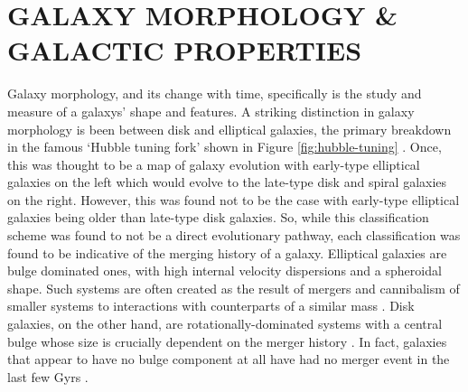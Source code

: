 \section{GALAXY MORPHOLOGY \& GALACTIC PROPERTIES}
\noindent Galaxy morphology, and its change with time, specifically is the study and measure of a galaxys' shape and features. A striking distinction in galaxy morphology is been between disk and elliptical galaxies, the primary breakdown in the famous `Hubble tuning fork' shown in Figure \ref{fig:hubble-tuning} \citep{1936rene.book.....H}. Once, this was thought to be a map of galaxy evolution with early-type elliptical galaxies on the left which would evolve to the late-type disk and spiral galaxies on the right. However, this was found not to be the case with early-type elliptical galaxies being older than late-type disk galaxies. So, while this classification scheme was found to not be a direct evolutionary pathway, each classification was found to be indicative of the merging history of a galaxy. Elliptical galaxies are bulge dominated ones, with high internal velocity dispersions and a spheroidal shape. Such systems are often created as the result of mergers and cannibalism of smaller systems to interactions with counterparts of a similar mass \citep{1996MNRAS.283.1361B, 2006MNRAS.366..499D}. Disk galaxies, on the other hand, are rotationally-dominated systems with a central bulge whose size is crucially dependent on the merger history \citep{1992ApJ...393..484B, 2010ApJ...715..202H, 2017ApJ...837L...8B}. In fact, galaxies that appear to have no bulge component at all have had no merger event in the last few Gyrs \citep{2012ApJ...756...26M}.

